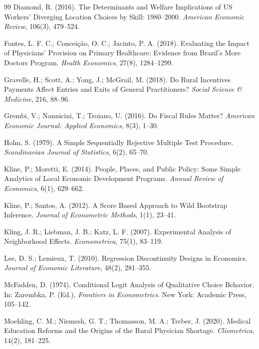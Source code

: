 \documentclass[11pt,a4paper]{article}
\begin{document}
\begin{thebibliography}{99}
Diamond, R. (2016). The Determinants and Welfare Implications of US Workers'
Diverging Location Choices by Skill: 1980--2000.
\textit{American Economic Review}, 106(3), 479--524.

Fontes, L. F. C.; Conceição, O. C.; Jacinto, P. A. (2018). Evaluating the
Impact of Physicians' Provision on Primary Healthcare: Evidence from Brazil's
More Doctors Program. \textit{Health Economics}, 27(8), 1284--1299.

Gravelle, H.; Scott, A.; Yong, J.; McGrail, M. (2018). Do Rural Incentives
Payments Affect Entries and Exits of General Practitioners?
\textit{Social Science \& Medicine}, 216, 88--96.

Grembi, V.; Nannicini, T.; Troiano, U. (2016). Do Fiscal Rules Matter?
\textit{American Economic Journal: Applied Economics}, 8(3), 1--30.

Holm, S. (1979). A Simple Sequentially Rejective Multiple Test Procedure.
\textit{Scandinavian Journal of Statistics}, 6(2), 65--70.

Kline, P.; Moretti, E. (2014). People, Places, and Public Policy: Some Simple
Analytics of Local Economic Development Programs.
\textit{Annual Review of Economics}, 6(1), 629--662.

Kline, P.; Santos, A. (2012). A Score Based Approach to Wild Bootstrap
Inference. \textit{Journal of Econometric Methods}, 1(1), 23--41.

Kling, J. R.; Liebman, J. B.; Katz, L. F. (2007). Experimental Analysis of
Neighborhood Effects. \textit{Econometrica}, 75(1), 83--119.

Lee, D. S.; Lemieux, T. (2010). Regression Discontinuity Designs in
Economics. \textit{Journal of Economic Literature}, 48(2), 281--355.

McFadden, D. (1974). Conditional Logit Analysis of Qualitative Choice
Behavior. In: Zarembka, P. (Ed.), \textit{Frontiers in Econometrics}.
New York: Academic Press, 105--142.

Moehling, C. M.; Niemesh, G. T.; Thomasson, M. A.; Treber, J. (2020). Medical
Education Reforms and the Origins of the Rural Physician Shortage.
\textit{Cliometrica}, 14(2), 181--225.


\end{thebibliography}
\end{document}
